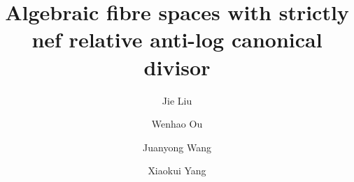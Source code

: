 \documentclass{./Article-eng}
\begin{document}
\title[Alg. fib. spaces w/ strictly nef rel. anti-log can. divisor]{Algebraic fibre spaces with strictly nef relative anti-log canonical divisor}



\author{
Jie Liu
}
\address{
Jie Liu\\
Institute of Mathematics, Academy of Mathematics and Systems Science, Chinese Academy of Sciences, Beijing, 100190, China}


\author{
Wenhao Ou
}
\address{
Wenhao Ou\\
Institute of Mathematics, Academy of Mathematics and Systems Science, Chinese Academy of Sciences, Beijing, 100190, China}

\author{
Juanyong Wang
}
\address{
Juanyong Wang\\
HCMS, Academy of Mathematics and Systems Science, Chinese Academy of Sciences, Beijing, 100190, China.}

\author{Xiaokui Yang
}
\address{
Xiaokui Yang\\
Department of Mathematics and Yau Mathematical Sciences Center, Tsinghua University, Beijing, 100084, China}
\end{document}
